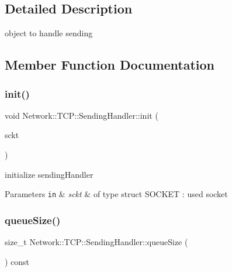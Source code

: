 \subsection{Detailed Description}
object to handle sending 

\subsection{Member Function Documentation}
\mbox{\label{class_network_1_1_t_c_p_1_1_sending_handler_a9d46cbd0e3bb87998de28f7afc494174}} 
\subsubsection{\texorpdfstring{init()}{init()}}
{\footnotesize\ttfamily void Network\+::\+T\+C\+P\+::\+Sending\+Handler\+::init (\begin{DoxyParamCaption}\item[{S\+O\+C\+K\+ET}]{sckt }\end{DoxyParamCaption})}



initialize sending\+Handler 


\begin{DoxyParams}[1]{Parameters}
\mbox{\tt in}  & {\em sckt} & of type struct S\+O\+C\+K\+ET \+: used socket \\
\hline
\end{DoxyParams}
\mbox{\label{class_network_1_1_t_c_p_1_1_sending_handler_a0ee93a4a671c89ca30ea191fdcacc745}} 
\subsubsection{\texorpdfstring{queue\+Size()}{queueSize()}}
{\footnotesize\ttfamily size\+\_\+t Network\+::\+T\+C\+P\+::\+Sending\+Handler\+::queue\+Size (\begin{DoxyParamCaption}{ }\end{DoxyParamCaption}) const}



